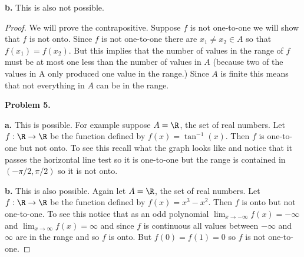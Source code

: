 \documentclass[oneside,12pt]{amsart}
\begin{document}
\textbf{b.} This is also not possible.
\begin{proof}
We will prove the contrapositive. Suppose $f$ is not one-to-one we will show
that $f$ is not onto. Since $f$ is not one-to-one there are $x_1\not=x_2\in A$
so that $f(x_1) = f(x_2)$. But this implies that the number of values in
the range of $f$ must be at most one less than the number of values in $A$
(because two of the values in A only produced one value in the range.) Since
$A$ is finite this means that not everything in $A$ can be in the range.

\medskip

\textbf{Problem 5.}

\textbf{a.} This is possible. For example suppose $A=\R$, the set of real
numbers. Let $f:\R\to\R$ be the function defined by $f(x)=\tan^{-1}(x)$.
Then $f$ is one-to-one but not onto. To see this recall what the graph looks
like and notice that it passes the horizontal line test so it is one-to-one
but the range is contained in $(-\pi/2, \pi/2)$ so it is not onto.

\textbf{b.} This is also possible. Again let $A=\R$, the set of real
numbers. Let $f:\R\to\R$ be the function defined by $f(x) = x^3 - x^2$. Then
$f$ is onto but not one-to-one. To see this notice that as an odd polynomial
$\lim_{x\to-\infty}f(x) = -\infty$ and $\lim_{x\to\infty}f(x) = \infty$ and
since $f$ is continuous all values between $-\infty$ and $\infty$ are in the
range and so $f$ is onto. But $f(0) = f(1) = 0$ so $f$ is not one-to-one.
\end{proof}
\end{document}
